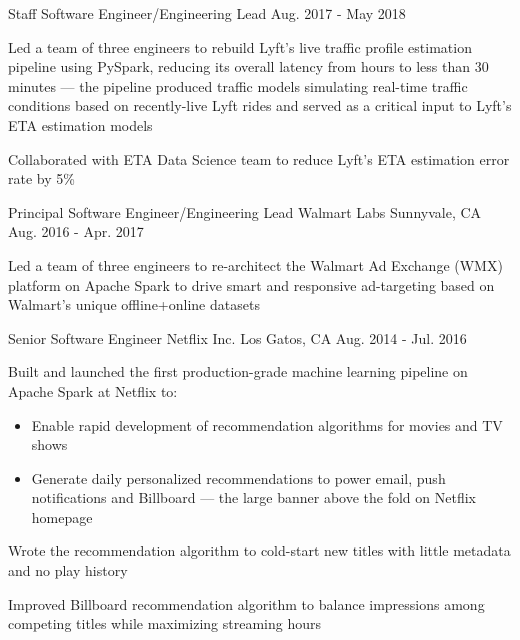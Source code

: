 \begin{cventries}
  \cventry
    {Staff Software Engineer/Engineering Lead} %
    {} %
    {} %
    {Aug. 2017 - May 2018} %
    {
      \begin{cvitems} %
        \item{Led a team of three engineers to rebuild Lyft's live traffic profile estimation pipeline using PySpark, reducing its overall latency from hours to less than 30 minutes --- the pipeline produced traffic models simulating real-time traffic conditions based on recently-live Lyft rides and served as a critical input to Lyft's ETA estimation models}
        \item{Collaborated with ETA Data Science team to reduce Lyft's ETA estimation error rate by 5\%}
      \end{cvitems}
    }

  \cventry
    {Principal Software Engineer/Engineering Lead} %
    {Walmart Labs} %
    {Sunnyvale, CA} %
    {Aug. 2016 - Apr. 2017} %
    {
      \begin{cvitems} %
        \item{Led a team of three engineers to re-architect the Walmart Ad Exchange (WMX) platform on Apache Spark to drive smart and responsive ad-targeting based on Walmart’s unique offline+online datasets}
      \end{cvitems}
    }

  \cventry
    {Senior Software Engineer} %
    {Netflix Inc.} %
    {Los Gatos, CA} %
    {Aug. 2014 - Jul. 2016} %
    {
      \begin{cvitems} %
        \item{Built and launched the first production-grade machine learning pipeline on Apache Spark at Netflix to:}
          \begin{itemize}[label=$\circ$]
            \item{Enable rapid development of recommendation algorithms for movies and TV shows}
            \item{Generate daily personalized recommendations to power email, push notifications and Billboard --- the large banner above the fold on Netflix homepage}
          \end{itemize}
        \item{Wrote the recommendation algorithm to cold-start new titles with little metadata and no play history}
        \item{Improved Billboard recommendation algorithm to balance impressions among competing titles while maximizing streaming hours}
      \end{cvitems}
    }


\end{cventries}
